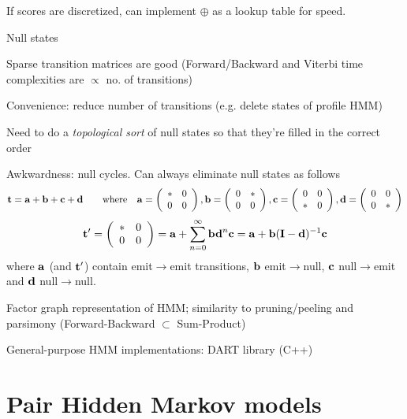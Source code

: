 \documentclass{beamer}
\begin{document}
\begin{frame}{}
\[\]
If scores are discretized, can implement $\oplus$ as a lookup table for speed.
\item Null states
 \itemb
 \item Sparse transition matrices are good (Forward/Backward and Viterbi time complexities are $\propto$ no. of transitions)
 \item Convenience: reduce number of transitions (e.g. delete states of profile HMM)
 \item Need to do a {\em topological sort} of null states so that they're filled in the correct order
 \item Awkwardness: null cycles. Can always eliminate null states as follows
\[
{\bf t} = {\bf a} + {\bf b} + {\bf c} + {\bf d}
 \quad\quad \mbox{where} \quad
{\bf a} = \left( \begin{array}{ll} \ast & 0 \\ 0 & 0 \end{array} \right),
{\bf b} = \left( \begin{array}{ll} 0 & \ast \\ 0 & 0 \end{array} \right),
{\bf c} = \left( \begin{array}{ll} 0 & 0 \\ \ast & 0 \end{array} \right),
{\bf d} = \left( \begin{array}{ll} 0 & 0 \\ 0 & \ast \end{array} \right)
\]
\[
{\bf t}' = \left( \begin{array}{ll} \ast & 0 \\ 0 & 0 \end{array} \right)
= {\bf a} + \sum_{n=0}^\infty {\bf bd}^n {\bf c} = {\bf a} + {\bf b} ({\bf I} - {\bf d})^{-1} {\bf c}
\]
where ${\bf a}$ (and ${\bf t}'$) contain emit$\to$emit transitions,
 ${\bf b}$ emit$\to$null,
 ${\bf c}$ null$\to$emit and
 ${\bf d}$ null$\to$null.
 \iteme
\item Factor graph representation of HMM; similarity to pruning/peeling and parsimony (Forward-Backward $\subset$ Sum-Product)
\item General-purpose HMM implementations: DART library (C++)
\iteme

\end{frame}

\section{Pair Hidden Markov models}
\end{document}
